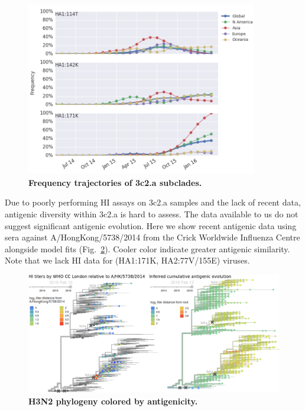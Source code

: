 \documentclass[11pt,oneside,letterpaper]{article}
\begin{document}
\begin{figure}[h!]
	\centering		
	\includegraphics[width=0.9\textwidth]{../figures/feb-2016/H3N2_mutations.png}
	\caption{\textbf{Frequency trajectories of 3c2.a subclades.} 
	}
	\label{H3N2_mutations}
\end{figure}

Due to poorly performing HI assays on 3c2.a samples and the lack of recent data, antigenic diversity within 3c2.a is hard to assess. The data available to us do not suggest significant antigenic evolution. Here we show recent antigenic data using sera against A/HongKong/5738/2014 from the Crick Worldwide Influenza Centre alongside model fits \cite{neher2015prediction} (Fig.\ \ref{H3N2_HI}). Cooler color indicate greater antigenic similarity. Note that we lack HI data for (HA1:171K, HA2:77V/155E) viruses.

\begin{figure}[h!]
	\centering		
	\includegraphics[width=1.0\textwidth]{../figures/feb-2016/H3N2_HI.png}
	\caption{\textbf{H3N2 phylogeny colored by antigenicity.} 
	}
	\label{H3N2_HI}
\end{figure}
\end{document}
